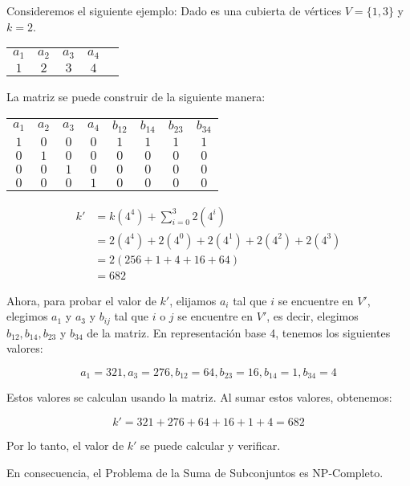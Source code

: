 \documentclass{article}
\begin{document}
Consideremos el siguiente ejemplo:
Dado es una cubierta de vértices \( V = \{1, 3\} \) y \( k = 2 \).

\begin{center}
\begin{tabular}{ccccc}
\( a_1 \) & \( a_2 \) & \( a_3 \) & \( a_4 \) \\
\( 1 \) & \( 2 \) & \( 3 \) & \( 4 \)
\end{tabular}
\end{center}

La matriz se puede construir de la siguiente manera:

\begin{center}
\begin{tabular}{cccccccc}
\( a_1 \) & \( a_2 \) & \( a_3 \) & \( a_4 \) & \( b_{12} \) & \( b_{14} \) & \( b_{23} \) & \( b_{34} \) \\
\( 1 \) & \( 0 \) & \( 0 \) & \( 0 \) & \( 1 \) & \( 1 \) & \( 1 \) & \( 1 \) \\
\( 0 \) & \( 1 \) & \( 0 \) & \( 0 \) & \( 0 \) & \( 0 \) & \( 0 \) & \( 0 \) \\
\( 0 \) & \( 0 \) & \( 1 \) & \( 0 \) & \( 0 \) & \( 0 \) & \( 0 \) & \( 0 \) \\
\( 0 \) & \( 0 \) & \( 0 \) & \( 1 \) & \( 0 \) & \( 0 \) & \( 0 \) & \( 0 \)
\end{tabular}
\end{center}

\[
\begin{align*}
k' &= k(4^{4}) + \sum_{i=0}^{3} 2(4^{i}) \\
   &= 2(4^{4}) + 2(4^{0}) + 2(4^{1}) + 2(4^{2}) + 2(4^{3}) \\
   &= 2(256 + 1 + 4 + 16 + 64) \\
   &= 682
\end{align*}
\]

Ahora, para probar el valor de \( k' \), elijamos \( a_i \) tal que \( i \) se encuentre en \( V' \), elegimos \( a_1 \) y \( a_3 \) y \( b_{ij} \) tal que \( i \) o \( j \) se encuentre en \( V' \), es decir, elegimos \( b_{12}, b_{14}, b_{23} \) y \( b_{34} \) de la matriz. En representación base 4, tenemos los siguientes valores:

\[
a_1 = 321, a_3 = 276, b_{12} = 64, b_{23} = 16, b_{14} = 1, b_{34} = 4
\]

Estos valores se calculan usando la matriz. Al sumar estos valores, obtenemos:

\[
k' = 321 + 276 + 64 + 16 + 1 + 4 = 682
\]

Por lo tanto, el valor de \( k' \) se puede calcular y verificar.

En consecuencia, el Problema de la Suma de Subconjuntos es NP-Completo.
\end{document}
